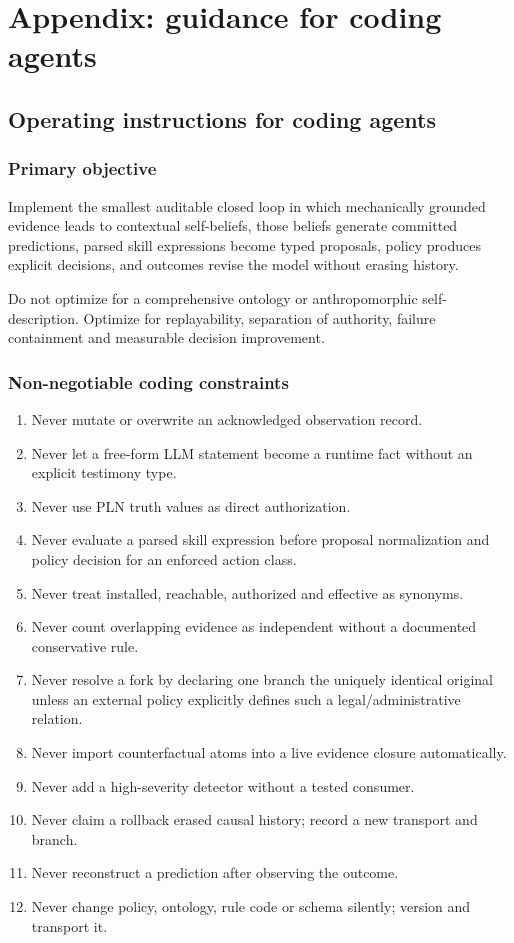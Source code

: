 \documentclass[11pt,oneside]{report}
\begin{document}
\part{Appendix: guidance for coding agents}

\chapter{Operating instructions for coding agents}

\section{Primary objective}

Implement the smallest auditable closed loop in which mechanically grounded evidence leads to contextual self-beliefs, those beliefs generate committed predictions, parsed skill expressions become typed proposals, policy produces explicit decisions, and outcomes revise the model without erasing history.

Do not optimize for a comprehensive ontology or anthropomorphic self-description. Optimize for replayability, separation of authority, failure containment and measurable decision improvement.

\section{Non-negotiable coding constraints}

\begin{enumerate}
  \item Never mutate or overwrite an acknowledged observation record.
  \item Never let a free-form LLM statement become a runtime fact without an explicit testimony type.
  \item Never use PLN truth values as direct authorization.
  \item Never evaluate a parsed skill expression before proposal normalization and policy decision for an enforced action class.
  \item Never treat installed, reachable, authorized and effective as synonyms.
  \item Never count overlapping evidence as independent without a documented conservative rule.
  \item Never resolve a fork by declaring one branch the uniquely identical original unless an external policy explicitly defines such a legal/administrative relation.
  \item Never import counterfactual atoms into a live evidence closure automatically.
  \item Never add a high-severity detector without a tested consumer.
  \item Never claim a rollback erased causal history; record a new transport and branch.
  \item Never reconstruct a prediction after observing the outcome.
  \item Never change policy, ontology, rule code or schema silently; version and transport it.
\end{enumerate}
\end{document}
